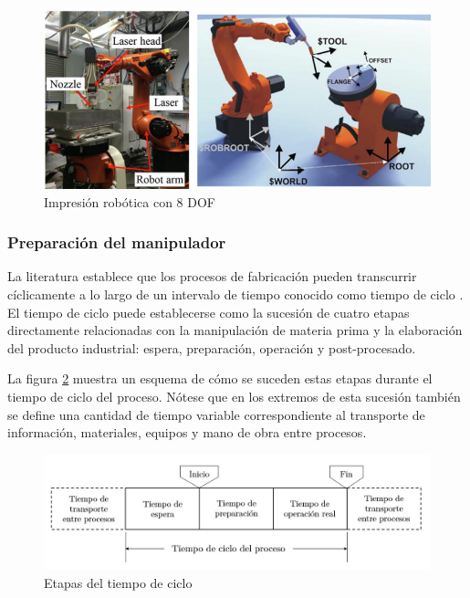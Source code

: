 \begin{figure}[h!]
    \centering
    \includegraphics[scale=0.3]{figuras/impresion_3d_robotica.png}
    \caption{Impresión robótica con 8 \acrshort{DOF} \cite{Shah_2022}}
    \label{fig:impresion_3d_robotica}
\end{figure}

\subsubsection*{Preparación del manipulador}
\hypertarget{Preparación del manipulador}{}

La literatura establece que los procesos de fabricación pueden transcurrir cíclicamente a lo largo de un intervalo de tiempo conocido como tiempo de ciclo \cite{Kalpajkin_2006}. El tiempo de ciclo puede establecerse como la sucesión de cuatro etapas directamente relacionadas con la manipulación de materia prima y la elaboración del producto industrial: espera, preparación, operación y post-procesado.

La figura \ref{fig:tiempo_ciclo} muestra un esquema de cómo se suceden estas etapas durante el tiempo de ciclo del proceso. Nótese que en los extremos de esta sucesión también se define una cantidad de tiempo variable correspondiente al transporte de información, materiales, equipos y mano de obra entre procesos.

\begin{figure}[h!]
    \centering
    \includegraphics[scale=0.4]{figuras/tiempo_ciclo_v2.jpg}
    \caption{Etapas del tiempo de ciclo \cite{Kalpajkin_2006}}
    \label{fig:tiempo_ciclo}
\end{figure}

